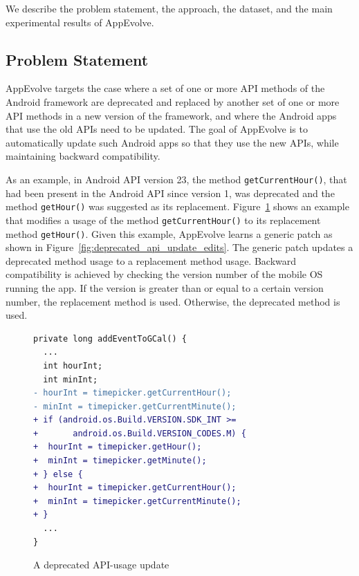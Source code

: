 We describe the problem statement, the approach, the dataset, and the main
experimental results of AppEvolve.

\subsection{Problem Statement}\label{sec:problem}

AppEvolve targets the case where a set of one or more API methods of the
Android framework are deprecated and replaced by another set of one or more
API methods in a new version of the framework, and where the Android apps
that use the old APIs need to be updated.  The goal of AppEvolve is to
automatically update such Android apps so that they use the new APIs, while
maintaining backward compatibility.


As an example, in Android API version 23, the method
\texttt{getCurrentHour()}, that had been present in the Android API since
version 1, was deprecated and the method \texttt{getHour()} was suggested
as its replacement.  Figure~\ref{fig:deprecated_api_update_example} shows
an example that modifies a usage of the method \texttt{getCurrentHour()} to
its replacement method \texttt{getHour()}. Given this example, AppEvolve learns a generic patch as shown in
Figure~\ref{fig:deprecated_api_update_edits}. The generic patch updates a
deprecated method usage to a replacement method usage.  Backward
compatibility is achieved by checking the version number of the mobile OS
running the app. If the version is greater than or equal to a certain
version number, the replacement method is used. Otherwise, the deprecated
method is used.

\begin{figure}[htb]
\centering
\begin{lstlisting}[language=diff,numbers=none]
private long addEventToGCal() {
  ...
  int hourInt;
  int minInt;
- hourInt = timepicker.getCurrentHour();
- minInt = timepicker.getCurrentMinute();
+ if (android.os.Build.VERSION.SDK_INT >=
+       android.os.Build.VERSION_CODES.M) {
+  hourInt = timepicker.getHour();
+  minInt = timepicker.getMinute();
+ } else {
+  hourInt = timepicker.getCurrentHour();
+  minInt = timepicker.getCurrentMinute();
+ }
  ...
}
\end{lstlisting}
\caption{A deprecated API-usage update}
\label{fig:deprecated_api_update_example}
\end{figure}

